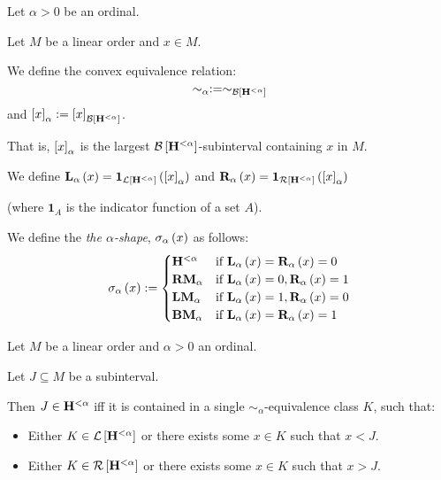 \begin{definition}
  Let $\alpha > 0$ be an ordinal.

  Let $M$ be a linear order and $x \in M$.

  We define the convex equivalence relation:
  \[\sim_\alpha := \sim_{\mathcal{B} \left[ {{\mathbf{H}_{}^{< \alpha}}} \right]}\]
  and $\left[ {x} \right]_{\alpha} := \left[ {x} \right]_{\mathcal{B} \left[ {{\mathbf{H}_{}^{< \alpha}}} \right]}$.

  That is,
  $\left[ {x} \right]_{\alpha}$ is the largest $\mathcal{B} \left[ {{\mathbf{H}_{}^{< \alpha}}} \right]$-subinterval
  containing $x$ in $M$.

  We define
  $\mathbf{L}_{\alpha} \left( {x} \right) = \mathbf{1}_{\mathcal{L} \left[ {{\mathbf{H}_{}^{< \alpha}}} \right]} \left( {\left[ {x} \right]_{\alpha}} \right)$ and
  $\mathbf{R}_{\alpha} \left( {x} \right) = \mathbf{1}_{\mathcal{R} \left[ {{\mathbf{H}_{}^{< \alpha}}} \right]} \left( {\left[ {x} \right]_{\alpha}} \right)$

  (where $\mathbf{1}_{A}$ is the indicator function of a set $A$).

  We define the \emph{the $\alpha$-shape}, $\sigma_{\alpha} \left( {x} \right)$ as follows:
  \[
    \sigma_{\alpha} \left( {x} \right) := \begin{cases}
      \mathbf{H}_{}^{< \alpha} & \text{if } \mathbf{L}_{\alpha} \left( {x} \right) = \mathbf{R}_{\alpha} \left( {x} \right) = 0    \\
      \mathbf{RM}_{\alpha}  & \text{if } \mathbf{L}_{\alpha} \left( {x} \right) = 0, \mathbf{R}_{\alpha} \left( {x} \right) = 1 \\
      \mathbf{LM}_{\alpha}  & \text{if } \mathbf{L}_{\alpha} \left( {x} \right) = 1, \mathbf{R}_{\alpha} \left( {x} \right) = 0 \\
      \mathbf{BM}_{\alpha}  & \text{if } \mathbf{L}_{\alpha} \left( {x} \right) = \mathbf{R}_{\alpha} \left( {x} \right) = 1
    \end{cases}
  \]
\end{definition}

\begin{lemma}\label{alpha-expressible}
  Let $M$ be a linear order and $\alpha > 0$ an ordinal.

  Let $J \subseteq M$ be a subinterval.

  Then $J \in \mathbf{H}_{}^{< \alpha}$ iff
  it is contained in a single $\sim_{\alpha}$-equivalence class $K$, such that:
  \begin{itemize}
    \item Either $K \in \mathcal{L} \left[ {{\mathbf{H}_{}^{< \alpha}}} \right]$ or
          there exists some $x \in K$ such that $x < J$.
    \item Either $K \in \mathcal{R} \left[ {{\mathbf{H}_{}^{< \alpha}}} \right]$ or
          there exists some $x \in K$ such that $x > J$.
  \end{itemize}
\end{lemma}

